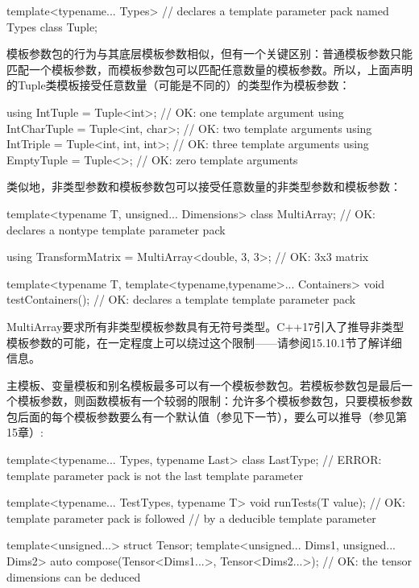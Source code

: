 \begin{cpp}
template<typename... Types> // declares a template parameter pack named Types
class Tuple;
\end{cpp}

模板参数包的行为与其底层模板参数相似，但有一个关键区别：普通模板参数只能匹配一个模板参数，而模板参数包可以匹配任意数量的模板参数。所以，上面声明的Tuple类模板接受任意数量（可能是不同的）的类型作为模板参数：

\begin{cpp}
using IntTuple = Tuple<int>; // OK: one template argument
using IntCharTuple = Tuple<int, char>; // OK: two template arguments
using IntTriple = Tuple<int, int, int>; // OK: three template arguments
using EmptyTuple = Tuple<>; // OK: zero template arguments
\end{cpp}

类似地，非类型参数和模板参数包可以接受任意数量的非类型参数和模板参数：

\begin{cpp}
template<typename T, unsigned... Dimensions>
class MultiArray; // OK: declares a nontype template parameter pack

using TransformMatrix = MultiArray<double, 3, 3>; // OK: 3x3 matrix

template<typename T, template<typename,typename>... Containers>
void testContainers(); // OK: declares a template template parameter pack
\end{cpp}

MultiArray要求所有非类型模板参数具有无符号类型。C++17引入了推导非类型模板参数的可能，在一定程度上可以绕过这个限制——请参阅15.10.1节了解详细信息。

主模板、变量模板和别名模板最多可以有一个模板参数包。若模板参数包是最后一个模板参数，则函数模板有一个较弱的限制：允许多个模板参数包，只要模板参数包后面的每个模板参数要么有一个默认值（参见下一节），要么可以推导（参见第15章）:

\begin{cpp}
template<typename... Types, typename Last>
class LastType; // ERROR: template parameter pack is not the last template parameter

template<typename... TestTypes, typename T>
void runTests(T value); // OK: template parameter pack is followed
// by a deducible template parameter

template<unsigned...> struct Tensor;
template<unsigned... Dims1, unsigned... Dims2>
auto compose(Tensor<Dims1...>, Tensor<Dims2...>);
// OK: the tensor dimensions can be deduced
\end{cpp}

